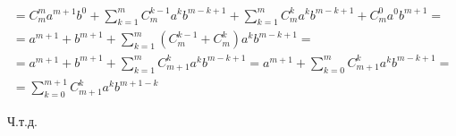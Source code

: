 \documentclass[12pt]{article}
\begin{document}
\begin{enumerate}
\begin{adjustwidth}{1.5em}{1.5em}
\begin{gather*}
                =C^{m}_{m}a^{m+1}b^{0}+\sum_{k=1}^{m}C^{k-1}_{m}a^{k}b^{m-k+1}+\sum_{k=1}^{m}C^{k}_{m}a^{k}b^{m-k+1}+C_{m}^{0}a^{0}b^{m+1} =\\
                =a^{m+1}+b^{m+1}+\sum_{k=1}^{m}\left(C^{k-1}_{m}+C^{k}_{m}\right)a^{k}b^{m-k+1} =\\
                =a^{m+1} + b^{m+1} + \sum_{k=1}^{m}C^{k}_{m+1}a^{k}b^{m-k+1} = a^{m+1} + \sum_{k=0}^{m}C^{k}_{m+1}a^{k}b^{m-k+1} =\\
                =\sum_{k=0}^{m+1}C^{k}_{m+1}a^{k}b^{m+1-k}
            \end{gather*}
            \begin{center}
                Ч.т.д.
            \end{center}
        \end{adjustwidth}
    \end{enumerate}
    \par
\end{document}
